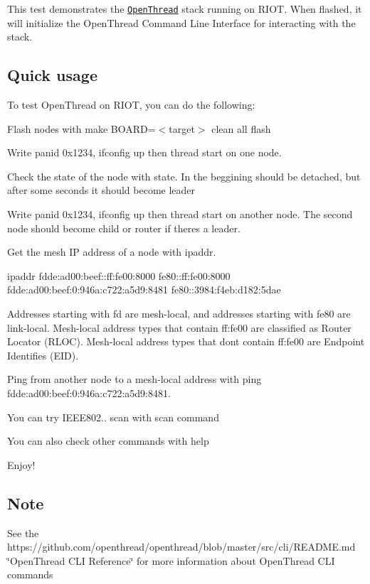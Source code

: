This test demonstrates the \href{https://github.com/openthread/openthread}{\tt Open\+Thread} stack running on R\+I\+OT. When flashed, it will initialize the Open\+Thread Command Line Interface for interacting with the stack.

\subsection*{Quick usage}

To test Open\+Thread on R\+I\+OT, you can do the following\+:


\begin{DoxyEnumerate}
\item Flash nodes with {\ttfamily make B\+O\+A\+RD=$<$target$>$ clean all flash}
\item Write {\ttfamily panid 0x1234}, {\ttfamily ifconfig up} then {\ttfamily thread start} on one node.
\item Check the state of the node with {\ttfamily state}. In the beggining should be {\ttfamily detached}, but after some seconds it should become {\ttfamily leader}
\item Write {\ttfamily panid 0x1234}, {\ttfamily ifconfig up} then {\ttfamily thread start} on another node. The second node should become {\ttfamily child} or {\ttfamily router} if there\textquotesingle{}s a leader.
\item Get the mesh IP address of a node with {\ttfamily ipaddr}.
\end{DoxyEnumerate}


\begin{DoxyCode}
 ipaddr
fdde:ad00:beef::ff:fe00:8000
fe80::ff:fe00:8000
fdde:ad00:beef:0:946a:c722:a5d9:8481
fe80::3984:f4eb:d182:5dae
\end{DoxyCode}


Addresses starting with {\ttfamily fd} are mesh-\/local, and addresses starting with {\ttfamily fe80} are link-\/local. Mesh-\/local address types that contain {\ttfamily ff\+:fe00} are classified as Router Locator (R\+L\+OC). Mesh-\/local address types that don\textquotesingle{}t contain {\ttfamily ff\+:fe00} are Endpoint Identifies (E\+ID).
\begin{DoxyEnumerate}
\item Ping from another node to a mesh-\/local address with {\ttfamily ping fdde\+:ad00\+:beef\+:0\+:946a\+:c722\+:a5d9\+:8481}.
\item You can try I\+E\+E\+E802.. scan with {\ttfamily scan} command
\item You can also check other commands with {\ttfamily help}
\item Enjoy!
\end{DoxyEnumerate}

\subsection*{Note}

See the https\+://github.com/openthread/openthread/blob/master/src/cli/\+R\+E\+A\+D\+M\+E.\+md \char`\"{}\+Open\+Thread C\+L\+I Reference\char`\"{} for more information about Open\+Thread C\+LI commands 